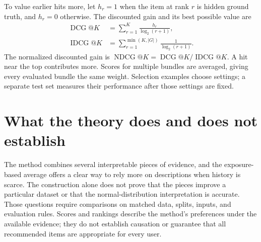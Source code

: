 \documentclass[11pt,a4paper]{article}
\numberwithin{equation}{section}
\begin{document}
To value earlier hits more, let $h_r=1$ when the item at rank $r$ is hidden ground truth,
and $h_r=0$ otherwise. The discounted gain and its best possible value are
\begin{align}
 \operatorname{DCG}@K&=\sum_{r=1}^{K}\frac{h_r}{\log_2(r+1)},\\
 \operatorname{IDCG}@K&=\sum_{r=1}^{\min(K,|G|)}\frac1{\log_2(r+1)}.
\end{align}
The normalized discounted gain is $\operatorname{NDCG}@K=\operatorname{DCG}@K/
\operatorname{IDCG}@K$. A hit near the top contributes more. Scores for multiple bundles
are averaged, giving every evaluated bundle the same weight. Selection examples choose
settings; a separate test set measures their performance after those settings are fixed.

\section{What the theory does and does not establish}
The method combines several interpretable pieces of evidence, and the exposure-based
average offers a clear way to rely more on descriptions when history is scarce. The
construction alone does not prove that the pieces improve a particular dataset or that the
normal-distribution interpretation is accurate. Those questions require comparisons on
matched data, splits, inputs, and evaluation rules. Scores and rankings describe the method's
preferences under the available evidence; they do not establish causation or guarantee that
all recommended items are appropriate for every user.
\end{document}
